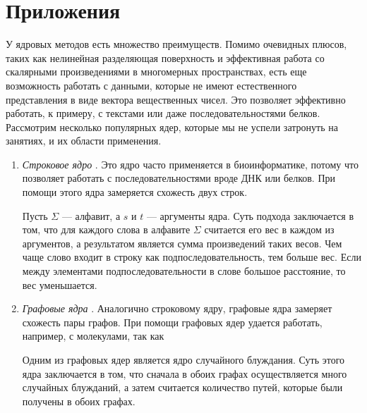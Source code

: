 \documentclass[12pt]{article}
\begin{document}
\section*{Приложения}
\par У ядровых методов есть множество преимуществ. Помимо очевидных плюсов, таких как нелинейная разделяющая поверхность и эффективная работа со скалярными произведениями в многомерных пространствах, есть еще возможность работать с данными, которые не имеют естественного представления в виде вектора вещественных чисел. Это позволяет эффективно работать, к примеру, с текстами или даже последовательностями белков. Рассмотрим несколько популярных ядер, которые мы не успели затронуть на занятиях, и их области применения.
\begin{enumerate}
\item \textit{Строковое ядро} \cite{lodhi}. Это ядро часто применяется в биоинформатике, потому что позволяет работать с последовательностями вроде ДНК или белков. При помощи этого ядра замеряется схожесть двух строк.
\par Пусть $ \Sigma $ --- алфавит, а $ s $ и $ t $ --- аргументы ядра. Суть подхода заключается в том, что для каждого слова в алфавите $ \Sigma $ считается его вес в каждом из аргументов, а результатом является сумма произведений таких весов. Чем чаще слово входит в строку как подпоследовательность, тем больше вес. Если между элементами подпоследовательности в слове большое расстояние, то вес уменьшается.

\item \textit{Графовые ядра} \cite{graph}. Аналогично строковому ядру, графовые ядра замеряет схожесть пары графов. При помощи графовых ядер удается работать, например, с молекулами, так как 
\par Одним из графовых ядер является ядро случайного блуждания. Суть этого ядра заключается в том, что сначала в обоих графах осуществляется много случайных блужданий, а затем считается количество путей, которые были получены в обоих графах.

\end{enumerate}

\newpage



\end{document}
